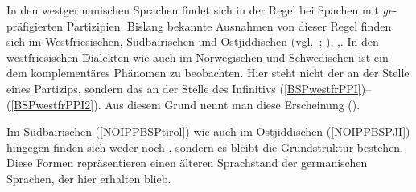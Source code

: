 \newpage 


In den westgermanischen Sprachen findet sich \hai{{\IPP}} in der Regel bei Spachen mit \textit{ge}-präfigierten Partizipien. Bislang bekannte Ausnahmen von dieser Regel finden sich im Westfriesischen, Südbairischen und Ostjiddischen (vgl.\, \citealt[77]{Vikner2001}; \citealt[11, 242, 313–315]{Schallert2012}), \citeyear{Schallert2013},. In den westfriesischen Dialekten wie auch im Norwegischen und Schwedischen ist ein dem \hai{{\IPP}} komplementäres Phänomen zu beobachten. Hier steht nicht der  an der Stelle eines Partizips, sondern das  an der Stelle des Infinitivs (\ref{BSPwestfrPPI})–(\ref{BSPwestfrPPI2}). Aus diesem Grund nennt man diese Erscheinung  (\hai{{\PPI}}). 

 
 
 
 Im Südbairischen (\ref{NOIPPBSPtirol}) wie auch im Ostjiddischen (\ref{NOIPPBSPJI}) hingegen finden sich weder \hai{{\IPP}} noch \hai{{\PPI}}, sondern es bleibt die Grundstruktur bestehen. Diese Formen repräsentieren einen älteren Sprachstand der germanischen Sprachen, der hier erhalten blieb. 
 
